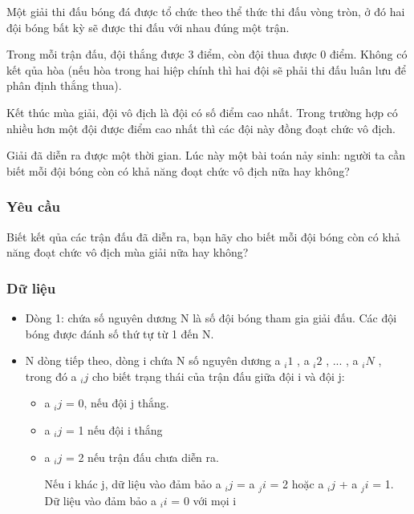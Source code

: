 



   Một giải thi đấu bóng đá được tổ chức theo thể thức thi đấu vòng tròn, ở đó hai đội bóng bất kỳ sẽ được thi đấu với nhau đúng một trận.  

   Trong mỗi trận đấu, đội thắng được 3 điểm, còn đội thua được 0 điểm. Không có kết qủa hòa (nếu hòa trong hai hiệp chính thì hai đội sẽ phải thi đấu luân lưu để phân định thắng thua).  

   Kết thúc mùa giải, đội vô địch là đội có số điểm cao nhất. Trong trường hợp có nhiều hơn một đội được điểm cao nhất thì các đội này đồng đoạt chức vô địch.  

   Giải đã diễn ra được một thời gian. Lúc này một bài toán nảy sinh: người ta cần biết mỗi đội bóng còn có khả năng đoạt chức vô địch nữa hay không?  

\subsubsection{   Yêu cầu  }

   Biết kết qủa các trận đấu đã diễn ra, bạn hãy cho biết mỗi đội bóng còn có khả năng đoạt chức vô địch mùa giải nữa hay không?  

\subsubsection{   Dữ liệu  }
\begin{itemize}
	\item     Dòng 1: chứa số nguyên dương N là số đội bóng tham gia giải đấu. Các đội bóng được đánh số thứ tự từ 1 đến N.   
	\item     N dòng tiếp theo, dòng i chứa N số nguyên dương a    $_     i1    $    , a    $_     i2    $    , ... , a    $_     iN    $    , trong đó a    $_     ij    $    cho biết trạng thái của trận đấu giữa đội i và đội j:    
\begin{itemize}
	\item       a      $_       ij      $      = 0, nếu đội j thắng.     
	\item       a      $_       ij      $      = 1 nếu đội i thắng     
	\item       a      $_       ij      $      = 2 nếu trận đấu chưa diễn ra.      

       Nếu i khác j, dữ liệu vào đảm bảo a       $_        ij       $       = a       $_        ji       $       = 2 hoặc a       $_        ij       $       + a       $_        ji       $       = 1. Dữ liệu vào đảm bảo a       $_        ii       $       = 0 với mọi i      
\end{itemize}
\end{itemize}

